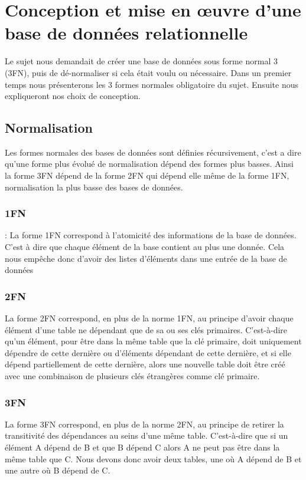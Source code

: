 \chapter{Conception et mise en œuvre d’une base de données relationnelle}
\minitoc
Le sujet nous demandait de créer une base de données sous forme normal 3 (3FN), puis de dé-normaliser si cela était voulu ou nécessaire. Dans un premier temps nous présenterons les 3 formes normales obligatoire du sujet. Ensuite nous expliqueront nos choix de conception.

\section{Normalisation}
Les formes normales des bases de données sont définies récursivement, c'est a dire qu'une forme plus évolué de normalisation dépend des formes plus basses. Ainsi la forme 3FN dépend de la forme 2FN qui dépend elle même de la forme 1FN, normalisation la plus basse des bases de données.
\cite{Database_normalization-wiki}

\subsection{1FN} :
La forme 1FN correspond à l'atomicité des informations de la base de données. C'est à dire que chaque élément de la base contient au plus une donnée. Cela nous empêche donc d'avoir des listes d'éléments dans une entrée de la base de données

\subsection{2FN}
La forme 2FN correspond, en plus de la norme 1FN, au principe d'avoir chaque élément d'une table ne dépendant que de sa ou ses clés primaires. C'est-à-dire qu'un élément, pour être dans la même table que la clé primaire, doit uniquement dépendre de cette dernière ou d'éléments dépendant de cette dernière, et si elle dépend partiellement de cette dernière, alors une nouvelle table doit être créé avec une combinaison de plusieurs clés étrangères comme clé primaire. 

\subsection{3FN}
La forme 3FN correspond, en plus de la norme 2FN, au principe de retirer la transitivité des dépendances au seins d'une même table. C'est-à-dire que si un élément A dépend de B et que B dépend C alors A ne peut pas être dans la même table que C. Nous devons donc avoir deux tables, une où A dépend de B et une autre où B dépend de C.

